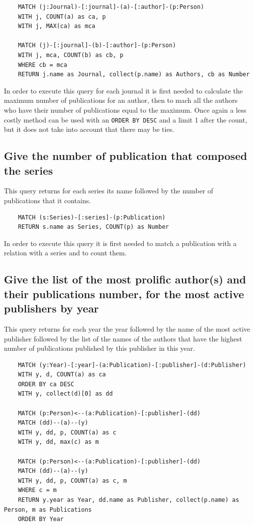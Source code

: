 \documentclass{article}
\begin{document}
\begin{lstlisting}
    MATCH (j:Journal)-[:journal]-(a)-[:author]-(p:Person)
    WITH j, COUNT(a) as ca, p
    WITH j, MAX(ca) as mca
    
    MATCH (j)-[:journal]-(b)-[:author]-(p:Person)
    WITH j, mca, COUNT(b) as cb, p
    WHERE cb = mca
    RETURN j.name as Journal, collect(p.name) as Authors, cb as Number
\end{lstlisting}

In order to execute this query for each journal it is first needed to calculate the maximum number of publications for an author, then to mach all the authors who have their number of publications equal to the maximum. Once again a less costly method can be used with an \texttt{ORDER BY DESC} and a limit 1 after the count, but it does not take into account that there may be ties.


\subsection{Give the number of publication that composed the series}
This query returns for each series its name followed by the number of publications that it contains.

\begin{lstlisting}
    MATCH (s:Series)-[:series]-(p:Publication)
    RETURN s.name as Series, COUNT(p) as Number
\end{lstlisting}

In order to execute this query it is first needed to match a publication with a relation with a series and to count them.

\subsection{Give the list of the most prolific author(s) and their publications number, for the most active publishers by year}
This query returns for each year the year followed by the name of the most active publisher followed by the list of the names of the authors that have the highest number of publications published by this publisher in this year.

\begin{lstlisting}
    MATCH (y:Year)-[:year]-(a:Publication)-[:publisher]-(d:Publisher)
    WITH y, d, COUNT(a) as ca 
    ORDER BY ca DESC
    WITH y, collect(d)[0] as dd
    
    MATCH (p:Person)<--(a:Publication)-[:publisher]-(dd)
    MATCH (dd)--(a)--(y)
    WITH y, dd, p, COUNT(a) as c
    WITH y, dd, max(c) as m
    
    MATCH (p:Person)<--(a:Publication)-[:publisher]-(dd)
    MATCH (dd)--(a)--(y)
    WITH y, dd, p, COUNT(a) as c, m
    WHERE c = m
    RETURN y.year as Year, dd.name as Publisher, collect(p.name) as Person, m as Publications
    ORDER BY Year
\end{lstlisting}
\end{document}

